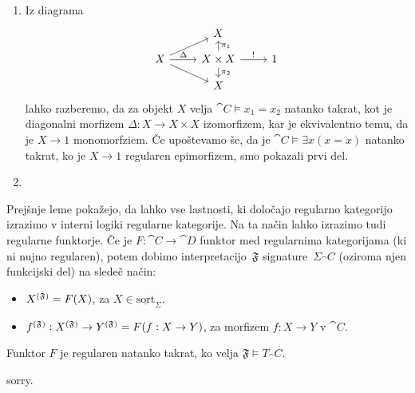 \documentclass[../kategoricna_logika.tex]{subfiles}
\begin{document}
\begin{dokaz}
  \begin{enumerate}[label=(\roman*)]
    \item Iz diagrama
      \begin{equation*}
      \begin{tikzcd}[row sep=small]
        & X & \\
        X \ar[ur] \ar[r, "\Delta"] \ar[dr] & X \times X \ar[u, "\pi_1"'] \ar[d, "\pi_2"] \ar[r, "!"] & 1 \\
        & X & 
      \end{tikzcd}
      \end{equation*}
      lahko razberemo, da za objekt $X$ velja 
      $\cat{C} \models x_1 = x_2$ natanko takrat, kot je diagonalni morfizem
      $\Delta : X \to X \times X$ izomorfizem, kar je ekvivalentno temu, da je $X \to 1$ monomorfziem.
      Če upoštevamo še, da je $\cat{C} \models \exists x (x = x)$ natanko takrat,
      ko je $X \to 1$ regularen epimorfizem, smo pokazali prvi del.
      
    \item 
  \end{enumerate}
\end{dokaz}

\noindent
Prejšnje leme pokažejo, da lahko vse lastnosti, ki določajo regularno kategorijo izrazimo v interni logiki regularne kategorije.
Na ta način lahko izrazimo tudi regularne funktorje.
Če je $F : \cat{C} \to \cat{D}$ funktor med regularnima kategorijama (ki ni nujno regularen),
potem dobimo interpretacijo~$\mathfrak{F}$ signature~$\Sigma_\cat{C}$ (oziroma njen funkcijski del) na sledeč način:
\begin{itemize}
  \item $\interp[\mathfrak{F}]{X} = F(X)$, za $X \in \underline{\mathrm{sort}}_{\Sigma}$.
  \item $\interp[\mathfrak{F}]{f} : \interp[\mathfrak{F}]{X} \to \interp[\mathfrak{F}]{Y} = F(f : X \to Y)$, za morfizem $f: X \to Y$ v $\cat{C}$.
\end{itemize}
\begin{lema}
  Funktor $F$ je regularen natanko takrat, ko velja $\mathfrak{F} \models T_\cat{C}$.
\end{lema}
\begin{dokaz}
  sorry.
\end{dokaz}
%
\end{document}
